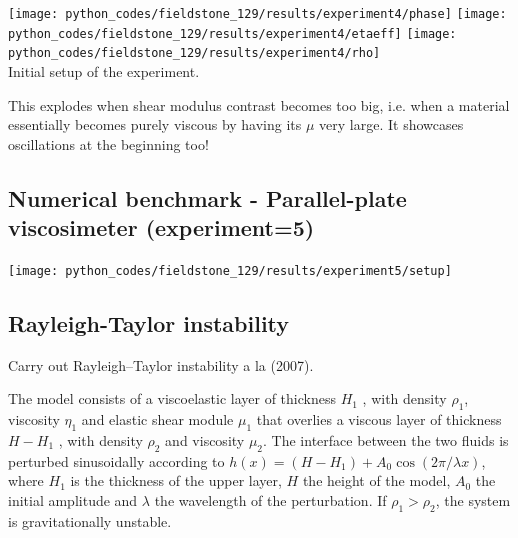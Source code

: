 \begin{center}
\texttt{[image: python\_codes/fieldstone\_129/results/experiment4/phase]}
\texttt{[image: python\_codes/fieldstone\_129/results/experiment4/etaeff]}
\texttt{[image: python\_codes/fieldstone\_129/results/experiment4/rho]}\\
{\captionfont Initial setup of the experiment.}
\end{center} 


{\color{red}This explodes when shear modulus contrast becomes too big, i.e. when a material 
essentially becomes purely viscous by having its $\mu$ very large. }
It showcases oscillations at the beginning too!





\newpage
\subsection*{Numerical benchmark - Parallel-plate viscosimeter (experiment=5)}

\begin{center}
\texttt{[image: python\_codes/fieldstone\_129/results/experiment5/setup]}
\end{center}



\newpage
\subsection*{Rayleigh-Taylor instability}

Carry out Rayleigh–Taylor instability a la \textcite{kabe07} (2007).

The model consists of a viscoelastic layer of thickness $H_1$ , with density $\rho_1$, 
viscosity $\eta_1$ and elastic shear module $\mu_1$ that overlies a viscous
layer of thickness $H-H_1$ , with density $\rho_2$ and viscosity $\mu_2$. 
The interface between the two fluids is perturbed sinusoidally according
to $h(x) = (H - H_1 ) + A_0 \cos (2\pi / \lambda x)$, 
where $H_1$ is the thickness of the upper layer, $H$ the height of the model, 
$A_0$ the initial amplitude and $\lambda$ the wavelength of the perturbation. 
If $\rho_1>\rho_2$, the system is gravitationally unstable.


